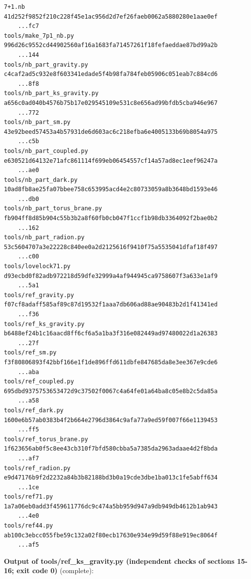 \documentclass[10pt,a4paper]{article}
\begin{document}
\begin{Verbatim}[fontsize=\small,frame=single,framesep=2mm]
7+1.nb                             41d252f9852f210c228f45e1ac956d2d7ef26faeb0062a5880280e1aae0ef
    ...fc7
tools/make_7p1_nb.py               996d26c9552cd44902560af16a1683fa71457261f18fefaeddae87bd99a2b
    ...144
tools/nb_part_gravity.py           c4caf2ad5c932e8f603341edade5f4b98fa784feb05906c051eab7c884cd6
    ...8f8
tools/nb_part_ks_gravity.py        a656c0ad040b4576b75b17e029545109e531c8e656ad99bfdb5cba946e967
    ...772
tools/nb_part_sm.py                43e92beed57453a4b57931de6d603ac6c218efba6e4005133b69b8054a975
    ...c5b
tools/nb_part_coupled.py           e630521d64132e71afc861114f699eb06454557cf14a57ad8ec1eef96247a
    ...ae0
tools/nb_part_dark.py              10ad8fb8ae25fa07bbee758c653995acd4e2c80733059a8b3648bd1593e46
    ...db0
tools/nb_part_torus_brane.py       fb904ff8d85b904c55b3b2a8f60fb0cb047f1ccf1b98db3364092f2bae0b2
    ...162
tools/nb_part_radion.py            53c5604707a3e22228c840ee0a2d2125616f9410f75a5535041dfaf18f497
    ...c00
tools/lovelock71.py                d93ecbd0f82adb972218d59dfe32999a4af944945ca9758607f3a633e1af9
    ...5a1
tools/ref_gravity.py               f07cf8adaff585af89c87d19532f1aaa7db606ad88ae90483b2d1f41341ed
    ...f36
tools/ref_ks_gravity.py            b6488ef24b1c16aacd8ff6cf6a5a1ba3f316e082449ad97480022d1a26383
    ...27f
tools/ref_sm.py                    f3f80806893f42bbf166e1f1de896ffd611dbfe847685da8e3ee367e9cde6
    ...aba
tools/ref_coupled.py               695dbd9375753653472d9c37502f0067c4a64fe01a64ba8c05e8b2c5da85a
    ...a58
tools/ref_dark.py                  1600e6b57ab0383b4f2b664e2796d3864c9afa77a9ed59f007f66e1139453
    ...ff5
tools/ref_torus_brane.py           1f623656ab0f5c8ee43cb310f7bfd580cbba5a7385da2963adaae4d2f8bda
    ...af7
tools/ref_radion.py                e9d47176b9f2d2232a84b3b82188bd3b0a19cde3dbe1ba013c1fe5abff634
    ...1ce
tools/ref71.py                     1a7a06eb0add3f459611776dc9c474a5bb959d947a9db949db4612b1ab943
    ...4e0
tools/ref44.py                     ab100c3ebcc055fbe59c132a02f80ecb17630e934e99d59f88e919ec8064f
    ...af5
\end{Verbatim}
\textbf{Output of tools/ref\_ks\_gravity.py (independent checks of sections 15-16; exit code 0)} (complete):
\end{document}
